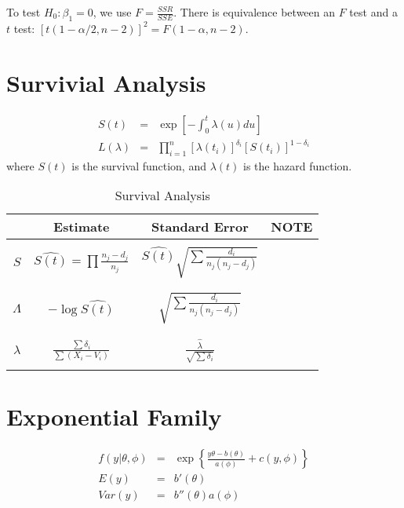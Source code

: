 \documentclass{article}
\begin{document}
To test $H_0: \beta_1 = 0$, we use $F = \frac{SSR}{SSE}$. There is equivalence between an $F$ test and a $t$ test: $[t(1-\alpha/2,n-2)]^2 = F(1-\alpha,n-2)$.








\section{Survivial Analysis}
\begin{eqnarray}
	S(t) &=& \exp \left[-\int_0^t \lambda(u) du \right] \\
	L(\lambda) &=& \prod_{i=1}^n [\lambda(t_i)]^{\delta_i} [S(t_i)]^{1-\delta_i}
\end{eqnarray}
where $S(t)$ is the survival function, and $\lambda(t)$ is the hazard function.

\begin{table}[h]
\centering
\begin{tabular}{c || c c c }
\hline
& {Estimate} & {Standard Error} & {NOTE} \\
\hline
\\
$S$& $\hat{S(t)} = \prod \frac{n_j-d_j}{n_j}$ & $\hat{S(t)} \sqrt{\sum \frac{d_i}{n_j(n_j-d_j)}}$ &\\
\\
\hline
\\
$\Lambda$& $-\log \hat{S(t)}$ & $\sqrt{\sum \frac{d_i}{n_j(n_j-d_j)}}$& \\
\\
\hline
\\
$\lambda$& $\frac{\sum \delta_i}{\sum (X_i-V_i)}$ & $\frac{\hat \lambda}{\sqrt{\sum \delta_i}}$\\
\\
\hline
\end{tabular}
\caption{Survival Analysis}
\end{table}


\section{Exponential Family}
\begin{eqnarray}
	f(y|\theta,\phi) & = & \exp \left\{ \frac{y\theta-b(\theta)}{a(\phi)}+c(y,\phi) \right\} \\
	E(y) & = & b'(\theta) \\
	Var(y) & = & b''(\theta)a(\phi)
\end{eqnarray}
\end{document}
